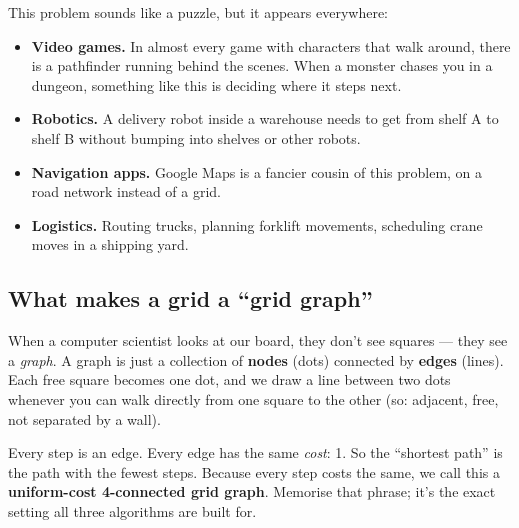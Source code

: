 \documentclass[11pt,a4paper]{article}
\begin{document}
This problem sounds like a puzzle, but it appears everywhere:

\begin{itemize}[leftmargin=20pt,itemsep=2pt]
  \item \textbf{Video games.} In almost every game with characters that walk around, there is a pathfinder running behind the scenes. When a monster chases you in a dungeon, something like this is deciding where it steps next.
  \item \textbf{Robotics.} A delivery robot inside a warehouse needs to get from shelf A to shelf B without bumping into shelves or other robots.
  \item \textbf{Navigation apps.} Google Maps is a fancier cousin of this problem, on a road network instead of a grid.
  \item \textbf{Logistics.} Routing trucks, planning forklift movements, scheduling crane moves in a shipping yard.
\end{itemize}

\subsection{What makes a grid a ``grid graph''}

When a computer scientist looks at our board, they don't see squares --- they see a \emph{graph}. A graph is just a collection of \textbf{nodes} (dots) connected by \textbf{edges} (lines). Each free square becomes one dot, and we draw a line between two dots whenever you can walk directly from one square to the other (so: adjacent, free, not separated by a wall).

\begin{center}
\end{center}

\noindent Every step is an edge. Every edge has the same \emph{cost}: 1. So the ``shortest path'' is the path with the fewest steps. Because every step costs the same, we call this a \textbf{uniform-cost 4-connected grid graph}. Memorise that phrase; it's the exact setting all three algorithms are built for.
\end{document}
